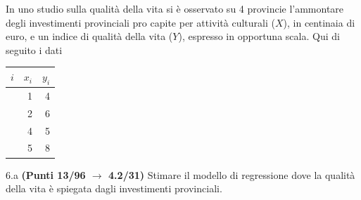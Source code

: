 \documentclass[
  11pt,
]{book}
\theoremstyle{mytheoremstyle}
\theoremstyle{mydefstyle}
\begin{document}
In uno studio sulla qualità della vita si è osservato su 4 provincie l'ammontare degli investimenti provinciali pro capite per attività culturali (\(X\)), in centinaia di euro, e un indice di qualità della vita (\(Y\)), espresso in opportuna scala. Qui di seguito i dati

\begin{table}[H]
\centering
\begin{tabular}{>{\raggedright\arraybackslash}p{3em}rr}
\toprule
$i$ & $x_i$ & $y_i$\\
\midrule
\cellcolor[HTML]{E6E6E6}{1} & 1 & 4\\
\cellcolor[HTML]{E6E6E6}{2} & 2 & 6\\
\cellcolor[HTML]{E6E6E6}{3} & 4 & 5\\
\cellcolor[HTML]{E6E6E6}{4} & 5 & 8\\
\bottomrule
\end{tabular}
\end{table}

6.a \textbf{(Punti 13/96 \(\rightarrow\) 4.2/31)} Stimare il modello di regressione dove la qualità della vita è spiegata dagli investimenti provinciali.
\end{document}
